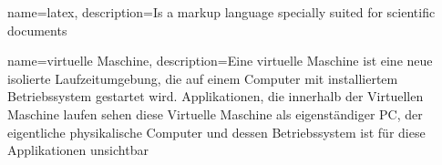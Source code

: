 {
    name=latex,
    description={Is a markup language specially suited 
    for scientific documents}
}

{
    name=virtuelle Maschine,
    description={Eine virtuelle Maschine ist eine neue isolierte Laufzeitumgebung, die auf einem Computer mit installiertem Betriebssystem gestartet wird. Applikationen, die innerhalb der Virtuellen Maschine laufen sehen diese Virtuelle Maschine als eigenständiger PC, der eigentliche physikalische Computer und dessen Betriebssystem ist für diese Applikationen unsichtbar}
}